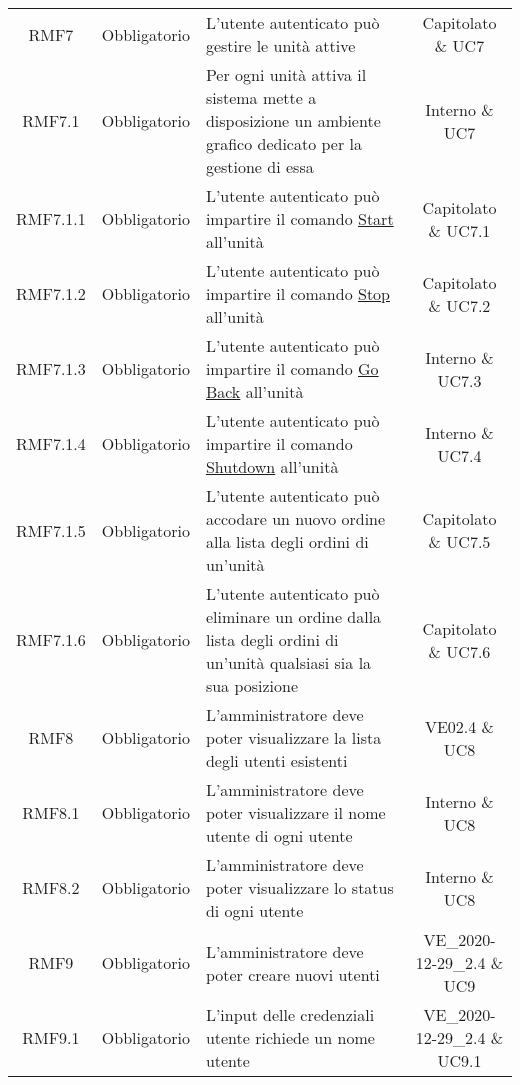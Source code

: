\begin{longtable}[h!] { c c m{8cm} c}
		RMF7 & Obbligatorio & L'utente autenticato può gestire le unità attive & Capitolato \& UC7 \\

		RMF7.1 & Obbligatorio & Per ogni unità attiva il sistema mette a disposizione un ambiente grafico dedicato per la gestione di essa & Interno \& UC7 \\

		RMF7.1.1 & Obbligatorio & L'utente autenticato può impartire il comando \underline{Start} all'unità & Capitolato \& UC7.1 \\

		RMF7.1.2 & Obbligatorio & L'utente autenticato può impartire il comando \underline{Stop} all'unità & Capitolato \& UC7.2 \\

		RMF7.1.3 & Obbligatorio & L'utente autenticato può impartire il comando \underline{Go Back} all'unità & Interno \& UC7.3 \\

		RMF7.1.4 & Obbligatorio & L'utente autenticato può impartire il comando \underline{Shutdown} all'unità & Interno \& UC7.4 \\

		RMF7.1.5 & Obbligatorio & L'utente autenticato può accodare un nuovo ordine alla lista degli ordini di un'unità & Capitolato \& UC7.5 \\

		RMF7.1.6 & Obbligatorio & L'utente autenticato può eliminare un ordine dalla lista degli ordini di un'unità qualsiasi sia la sua posizione & Capitolato \& UC7.6 \\

		RMF8 & Obbligatorio & L'amministratore deve poter visualizzare la lista degli utenti esistenti & VE02.4 \& UC8 \\

		RMF8.1 & Obbligatorio & L'amministratore deve poter visualizzare il nome utente di ogni utente & Interno \& UC8 \\

		RMF8.2 & Obbligatorio & L'amministratore deve poter visualizzare lo status di ogni utente & Interno \& UC8 \\

		RMF9 & Obbligatorio & L'amministratore deve poter creare nuovi utenti & VE\_2020-12-29\_2.4 \& UC9 \\

		RMF9.1 & Obbligatorio & L'input delle credenziali utente richiede un nome utente & VE\_2020-12-29\_2.4 \& UC9.1 \\


\end{longtable}
